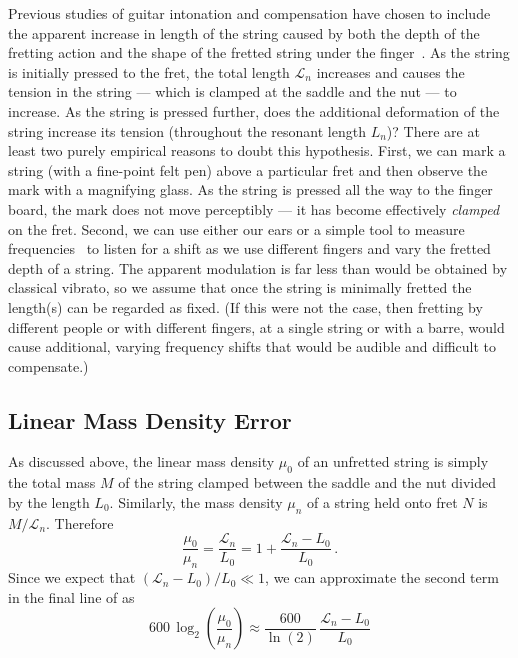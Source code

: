 Previous studies of guitar intonation and compensation have chosen to include the apparent increase in length of the string caused by both the depth of the fretting action  and the shape of the fretted string under the finger~\cite{ref:byers1996cgi,ref:varieschi2010icf}. As the string is initially pressed to the fret, the total length $\mathcal{L}_n$ increases and causes the tension in the string --- which is clamped at the saddle and the nut --- to increase. As the string is pressed further, does the additional deformation of the string increase its tension (throughout the resonant length $L_n$)? There are at least two purely empirical reasons to doubt this hypothesis. First, we can mark a string (with a fine-point felt pen) above a particular fret and then observe the mark with a magnifying glass. As the string is pressed all the way to the finger board, the mark does not move perceptibly --- it has become effectively \emph{clamped} on the fret. Second, we can use either our ears or a simple tool to measure frequencies~\cite{ref:pgtweb} to listen for a shift as we use different fingers and vary the fretted depth of a string. The apparent modulation is far less than would be obtained by classical vibrato, so we assume that once the string is minimally fretted the length(s) can be regarded as fixed. (If this were not the case, then fretting by different people or with different fingers, at a single string or with a barre, would cause additional, varying frequency shifts that would be audible and difficult to compensate.)

 \subsection{Linear Mass Density Error}
As discussed above, the linear mass density $\mu_0$ of an unfretted string is simply the total mass $M$ of the string clamped between the saddle and the nut divided by the length $L_0$. Similarly, the mass density $\mu_n$ of a string held onto fret $N$ is $M/\mathcal{L}_n$. Therefore
 \begin{equation}
\frac{\mu_0}{\mu_n} = \frac{\mathcal{L}_n}{L_0} = 1 + \frac{\mathcal{L}_n - L_0}{L_0}\, .
 \end{equation}
Since we expect that $(\mathcal{L}_n - L_0)/L_0 \ll 1$, we can approximate the second term in the final line of  as
 \begin{equation}
600\, \log_2 \left(  \frac{\mu_0}{\mu_n} \right) \approx \frac{600}{\ln(2)}\, \frac{\mathcal{L}_n - L_0}{L_0}
 \end{equation}

